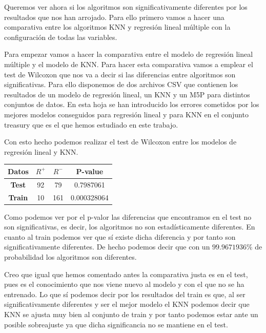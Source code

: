\documentclass[12pt,a4paper]{article}
\begin{document}
Queremos ver ahora si los algoritmos son significativamente diferentes por los resultados que nos han arrojado. Para ello primero vamos a hacer una comparativa entre los algoritmos KNN y regresión lineal múltiple con la configuración de todas las variables.

Para empezar vamos a hacer la comparativa entre el modelo de regresión lineal múltiple y el modelo de KNN. Para hacer esta comparativa vamos a emplear el test de Wilcoxon que nos va a decir si las diferencias entre algoritmos son significativas. Para ello disponemos de dos archivos CSV que contienen los resultados de un modelo de regresión lineal, un KNN y un M5P para distintos conjuntos de datos. En esta hoja se han introducido los errores cometidos por los mejores modelos conseguidos para regresión lineal y para KNN en el conjunto treasury que es el que hemos estudiado en este trabajo.

Con esto hecho podemos realizar el test de Wilcoxon entre los modelos de regresión lineal y KNN. 

\begin{table}[H]
	\centering
	\begin{tabular}{|c|c|c|c|}
		\hline
		\textbf{Datos} & \textbf{$R^+$} & \textbf{$R^-$} & \textbf{P-value} \\ \hline
		\textbf{Test}  & 92             & 79             & 0.7987061        \\ \hline
		\textbf{Train} & 10             & 161            & 0.000328064      \\ \hline
	\end{tabular}
\end{table}

Como podemos ver por el p-valor las diferencias que encontramos en el test no son significativas, es decir, los algoritmos no son estadísticamente diferentes. En cuanto al train podemos ver que sí existe dicha diferencia y por tanto son significativamente diferentes. De hecho podemos decir que con un $99.9671936\%$ de probabilidad los algoritmos son diferentes.

Creo que igual que hemos comentado antes la comparativa justa es en el test, pues es el conocimiento que nos viene nuevo al modelo y con el que no se ha entrenado. Lo que sí podemos decir por los resultados del train es que, al ser significativamente diferentes y ser el mejor modelo el KNN podemos decir que KNN se ajusta muy bien al conjunto de train y por tanto podemos estar ante un posible sobreajuste ya que dicha significancia no se mantiene en el test.
\end{document}
